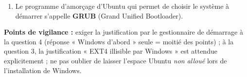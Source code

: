 \documentclass[11pt]{article}
\begin{document}
\begin{corrige}
\begin{enumerate}
\begin{enumerate}
    \item Lancer la copie des fichiers d'installation (redémarrages automatiques) ;
    \item Effectuer la configuration finale (clé de produit, compte utilisateur, OOBE) jusqu'au premier démarrage de Windows.
  \end{enumerate}
  \item Le programme d'amorçage d'Ubuntu qui permet de choisir le système à démarrer s'appelle \textbf{GRUB} (Grand Unified Bootloader).
\end{enumerate}
\textbf{Points de vigilance :} exiger la justification par le gestionnaire de démarrage à la question 4 (réponse « Windows d'abord » seule = moitié des points) ; à la question 3, la justification « EXT4 illisible par Windows » est attendue explicitement ; ne pas oublier de laisser l'espace Ubuntu \emph{non alloué} lors de l'installation de Windows.
\end{corrige}
\end{document}
